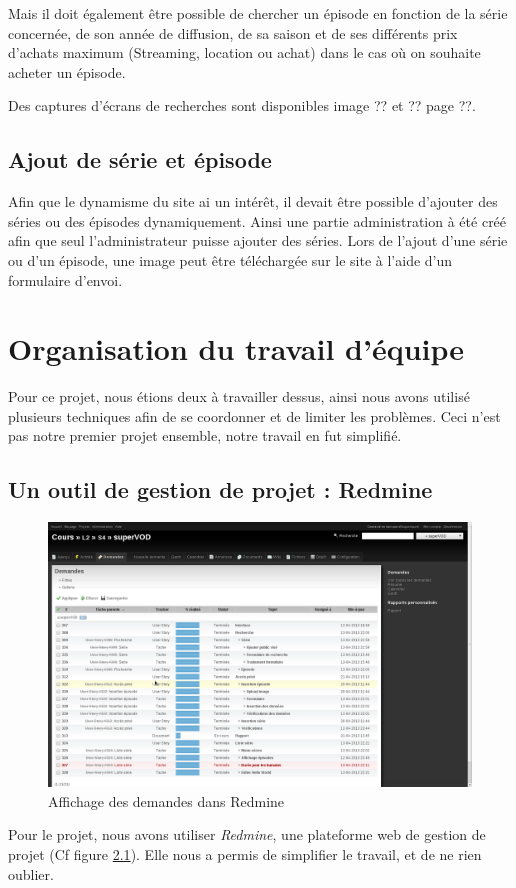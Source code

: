 \documentclass[12pt,a4paper,openany]{book}
\begin{document}
	Mais il doit également être possible de chercher un épisode en fonction de la série concernée, de son année de diffusion, de sa saison et de ses différents
	prix d'achats maximum (Streaming, location ou achat) dans le cas où on souhaite acheter un épisode.

	Des captures d'écrans de recherches sont disponibles image ?? et ?? page ??. %
	\section{Ajout de série et épisode}
		Afin que le dynamisme du site ai un intérêt, il devait être possible d'ajouter des séries ou des épisodes dynamiquement. Ainsi une partie administration
		à été créé afin que seul l'administrateur puisse ajouter des séries. Lors de l'ajout d'une série ou d'un épisode, une image peut être téléchargée sur le
		site à l'aide d'un formulaire d'envoi.

	\chapter{Organisation du travail d'équipe}
	Pour ce projet, nous étions deux à travailler dessus, ainsi nous avons utilisé plusieurs techniques afin de se coordonner et de limiter les problèmes. Ceci
	n'est pas notre premier projet ensemble, notre travail en fut simplifié.
	\section{Un outil de gestion de projet : Redmine}
	\begin{figure}[H]
		\centering
		\includegraphics[width=18cm]{screens/redmine.png}
		\caption{Affichage des demandes dans Redmine}
		\label{fig:redmine}
	\end{figure}
	Pour le projet, nous avons utiliser \textit{Redmine}, une plateforme web de gestion de projet (Cf figure \ref{fig:redmine}). Elle nous a permis de simplifier le travail, et
	de ne rien oublier.
\end{document}
